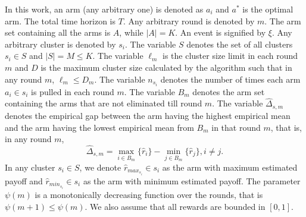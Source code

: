 In this work, an arm (any arbitrary one) is denoted as $a_{i}$ and $a^{*}$ is the optimal arm. The total time horizon is $T$. Any arbitrary round is denoted by $m$. The arm set containing all the arms is $A$, while $|A|=K$. An event is signified by $\xi$. Any arbitrary cluster is denoted by $s_{i}$. The variable $S$ denotes the set of all clusters $s_{i}\in S$ and $|S|=M\leq K$. The variable $\ell_{m}$ is the cluster size limit in each round $m$ and $D$ is the maximum cluster size calculated by the algorithm such that in any round $m$, $\ell_{m}\leq D_{m}$. 
The variable $n_{s_{i}}$ denotes the number of times each arm $a_{i}\in s_{i}$ is pulled in each round $m$. The variable $B_{m}$ denotes the arm set containing the arms that are not eliminated till round $m$. 
The variable $\hat{\Delta}_{s,m}$ denotes the empirical gap between the arm having the highest empirical mean and the arm having the lowest empirical mean from $B_{m}$ in that round $m$, that is, in any round $m$, 
$$\hat{\Delta}_{s,m}=\max_{i\in B_{m}}{\lbrace\hat{r}_{i}\rbrace}-\min_{j\in B_{m}}{\lbrace\hat{r}_{j}\rbrace}, i\neq j.$$ 
 In any cluster $s_{i}\in S$, we denote $\hat{r}_{max_{s_{i}}}\in s_{i}$ as the arm with maximum estimated payoff and $\hat{r}_{min_{s_{i}}}\in s_{i}$ as the arm with minimum estimated payoff. 
The parameter $\psi(m)$ is a monotonically decreasing function over the rounds, that is $\psi(m+1)\leq \psi(m)$. 
We also assume that all rewards are bounded in $[0,1]$.

